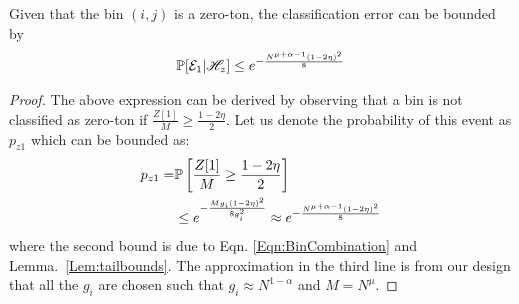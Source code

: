 \begin{lemma}
\label{Lem:ZerotonClassif}
Given that the bin $(i,j)$ is a zero-ton, the classification error can be bounded by
\begin{align*}
\mathbb{P}[\mathcal{E}_1|\mathscr{H}_z]\leq e^{-\frac{N^{\mu+\alpha-1}(1-2\eta)^2}{8}}
\end{align*}
\end{lemma}
\begin{proof}
The above expression can be derived by observing that a bin is not classified as zero-ton if $\frac{Z[1]}{M}\geq\frac{1-2\eta}{2}$. Let us denote the probability of this event as $p_{z1}$ which can be bounded as:
\begin{align*}
p_{z1}=&\mathbb{P}\left[\frac{Z[1]}{M}\geq\frac{1-2\eta}{2}\right]\\
&\leq e^{-\frac{Mg_i(1-2\eta)^2}{8g_i^{2}}} \approx e^{-\frac{N^{\mu+\alpha-1}(1-2\eta)^2}{8}}
\end{align*} 
where the second bound is due to Eqn. \eqref{Eqn:BinCombination} and Lemma.~\ref{Lem:tailbounds}. The approximation in the third line is from our design that all the $g_i$ are chosen such that $g_i\approx N^{1-\alpha}$ and $M=N^{\mu}.$
\end{proof}

